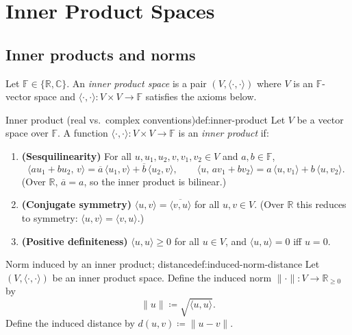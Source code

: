 
\section{Inner Product Spaces}

\subsection{Inner products and norms}

Let $\mathbb{F}\in\{\mathbb{R},\mathbb{C}\}$. An \emph{inner product space} is a pair $(V,\langle\cdot,\cdot\rangle)$ where
$V$ is an $\mathbb{F}$-vector space and $\langle\cdot,\cdot\rangle:V\times V\to \mathbb{F}$ satisfies the axioms below.

\begin{definition}{Inner product (real vs.\ complex conventions)}{def:inner-product}
Let $V$ be a vector space over $\mathbb{F}$.
A function $\langle\cdot,\cdot\rangle:V\times V\to\mathbb{F}$ is an \emph{inner product} if:
\begin{enumerate}[label=(\alph*),leftmargin=*]
\item \textbf{(Sesquilinearity)} For all $u,u_1,u_2,v,v_1,v_2\in V$ and $a,b\in\mathbb{F}$,
\[
\langle a u_1+b u_2,\, v\rangle=\overline{a}\,\langle u_1,v\rangle+\overline{b}\,\langle u_2,v\rangle,
\qquad
\langle u,\, a v_1+b v_2\rangle=a\,\langle u,v_1\rangle+b\,\langle u,v_2\rangle.
\]
(Over $\mathbb{R}$, $\overline{a}=a$, so the inner product is bilinear.)
\item \textbf{(Conjugate symmetry)} $\langle u,v\rangle=\overline{\langle v,u\rangle}$ for all $u,v\in V$.
(Over $\mathbb{R}$ this reduces to symmetry: $\langle u,v\rangle=\langle v,u\rangle$.)
\item \textbf{(Positive definiteness)} $\langle u,u\rangle\ge 0$ for all $u\in V$, and $\langle u,u\rangle=0$ iff $u=0$.
\end{enumerate}
\end{definition}

\begin{definition}{Norm induced by an inner product; distance}{def:induced-norm-distance}
Let $(V,\langle\cdot,\cdot\rangle)$ be an inner product space.
Define the induced norm $\|\cdot\|:V\to\mathbb{R}_{\ge 0}$ by
\[
\|u\|\coloneqq \sqrt{\langle u,u\rangle}.
\]
Define the induced distance by $d(u,v)\coloneqq \|u-v\|$.
\end{definition}


